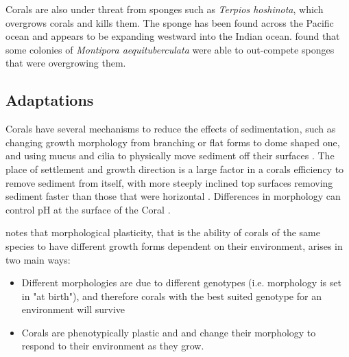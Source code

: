 \documentclass[11pt,a4paper]{article}
\begin{document}
Corals are also under threat from sponges \citep{Elliott2016} such as \textit{Terpios hoshinota}, which overgrows corals and kills them. The sponge has been found across the Pacific ocean and appears to be expanding westward into the Indian ocean. \cite{Elliott2016} found that some colonies of \textit{Montipora aequituberculata} were able to out-compete sponges that were overgrowing them.

\subsection{Adaptations}


Corals have several mechanisms to reduce the effects of sedimentation, such as changing growth morphology from branching or flat forms to dome shaped one, and using mucus and cilia to physically move sediment off their surfaces \citep{Logan1988, Stafford1992}. The place of settlement and growth direction is a large factor in a corals efficiency to remove sediment from itself, with more steeply inclined top surfaces removing sediment faster than those that were horizontal \citep{Logan1988}. Differences in morphology can control pH at the surface of the Coral \citep{Chan2016}.



\cite{Todd2008} notes that morphological plasticity, that is the ability of corals of the same species to have different growth forms dependent on their environment, arises in two main ways:
\begin{itemize}
\item Different morphologies are due to different genotypes (i.e. morphology is set in "at birth"), and therefore corals with the best suited genotype for an environment will survive \citep{Ayre1988}
\item  Corals are phenotypically plastic and and change their morphology to respond to their environment as they grow. \citep{Muko2000}
\end{itemize}
\end{document}
